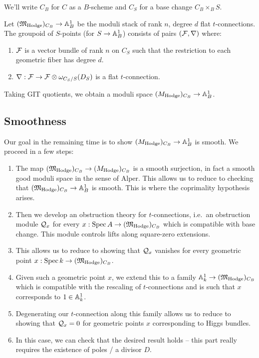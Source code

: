 \documentclass{amsart}
\begin{document}
We'll write $C_B$ for $C$ as a $B$-scheme and $C_S$ for a base change $C_B \times_B S$.

\begin{dfn}
	Let $(\MHodgefr)_{C_B} \to \AA^1_B$ be the moduli stack of rank $n$, degree $d$ flat $t$-connections.
	The groupoid of $S$-points (for $S \to \AA^1_B$) consists of pairs $(\Fc, \nabla)$ where:
	\begin{enumerate}
		\item $\Fc$ is a vector bundle of rank $n$ on $C_S$ such that the restriction to each geometric fiber has degree $d$.
		\item $\nabla: \Fc \to \Fc \otimes \omega_{C_S / S}(D_S)$ is a flat $t$-connection.
	\end{enumerate}
	Taking GIT quotients, we obtain a moduli space $(\MHodge)_{C_B} \to \AA^1_B$.
\end{dfn}

\subsection{Smoothness}

Our goal in the remaining time is to show $(\MHodge)_{C_B} \to \AA^1_B$ is smooth.
We proceed in a few steps:
\begin{enumerate}
	\item The map $(\MHodgefr)_{C_B} \to (\MHodge)_{C_B}$ is a smooth surjection, in fact a smooth good moduli space in the sense of Alper.
		This allows us to reduce to checking that $(\MHodgefr)_{C_B} \to \AA^1_B$ is smooth.
		This is where the coprimality hypothesis arises.
	\item Then we develop an obstruction theory for $t$-connections, i.e.\ an obstruction module $\Qc_x$ for every $x: \Spec A \to (\MHodgefr)_{C_B}$ which is compatible with base change.
		This module controls lifts along square-zero extensions.
	\item This allows us to reduce to showing that $\Qc_x$ vanishes for every geometric point $x: \Spec k \to (\MHodgefr)_{C_B}$.
	\item Given such a geometric point $x$, we extend this to a family $\AA^1_k \to (\MHodgefr)_{C_B}$ which is compatible with the rescaling of $t$-connections and is such that $x$ corresponds to $1 \in \AA^1_k$.
	\item Degenerating our $t$-connection along this family allows us to reduce to showing that $\Qc_x = 0$ for geometric points $x$ corresponding to Higgs bundles.
	\item In this case, we can check that the desired result holds -- this part really requires the existence of poles / a divisor $D$.
\end{enumerate}
\end{document}
